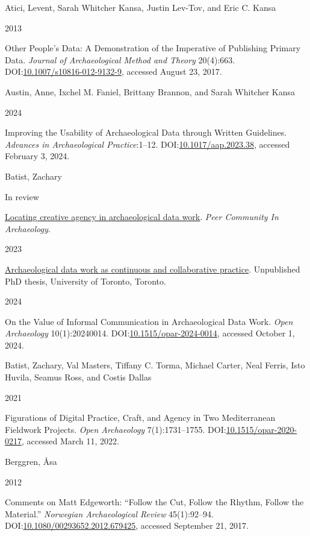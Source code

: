 \documentclass[
]{article}
\newlength{\cslhangindent}
\newlength{\csllabelwidth}
\newenvironment{CSLReferences}[2] %
 {\begin{list}{}{%
  \setlength{\itemindent}{0pt}
  \setlength{\leftmargin}{0pt}
  \setlength{\parsep}{0pt}
  \ifodd #1
   \setlength{\leftmargin}{\cslhangindent}
   \setlength{\itemindent}{-1\cslhangindent}
  \fi
  \setlength{\itemsep}{#2\baselineskip}}}
 {\end{list}}
\newcommand{\CSLBlock}[1]{\hfill\break\parbox[t]{\linewidth}{\strut\ignorespaces#1\strut}}
\newcommand{\CSLLeftMargin}[1]{\parbox[t]{\csllabelwidth}{\strut#1\strut}}
\newcommand{\CSLRightInline}[1]{\parbox[t]{\linewidth - \csllabelwidth}{\strut#1\strut}}
\begin{document}
\label{refs}
\begin{CSLReferences}{0}{1}
\CSLBlock{Atici, Levent, Sarah Whitcher Kansa, Justin Lev-Tov, and Eric
C. Kansa}
\CSLLeftMargin{ 2013}%
\CSLRightInline{Other {People}'s {Data}: {A Demonstration} of the
{Imperative} of {Publishing Primary Data}. \emph{Journal of
Archaeological Method and Theory} 20(4):663.
DOI:\href{https://doi.org/10.1007/s10816-012-9132-9}{10.1007/s10816-012-9132-9},
accessed August 23, 2017.}

\CSLBlock{Austin, Anne, Ixchel M. Faniel, Brittany Brannon, and Sarah
Whitcher Kansa}
\CSLLeftMargin{ 2024}%
\CSLRightInline{Improving the {Usability} of {Archaeological Data}
through {Written Guidelines}. \emph{Advances in Archaeological
Practice}:1--12.
DOI:\href{https://doi.org/10.1017/aap.2023.38}{10.1017/aap.2023.38},
accessed February 3, 2024.}

\CSLBlock{Batist, Zachary}
\CSLLeftMargin{ In review}%
\CSLRightInline{\href{https://zackbatist.info/locating-creative-agency/}{Locating
creative agency in archaeological data work}. \emph{Peer Community In
Archaeology}.}

\CSLLeftMargin{ 2023 }%
\CSLRightInline{\href{https://hdl.handle.net/1807/130306}{Archaeological
data work as continuous and collaborative practice}. Unpublished PhD
thesis, University of Toronto, Toronto.}

\CSLLeftMargin{ 2024 }%
\CSLRightInline{On the {Value} of {Informal Communication} in
{Archaeological Data Work}. \emph{Open Archaeology} 10(1):20240014.
DOI:\href{https://doi.org/10.1515/opar-2024-0014}{10.1515/opar-2024-0014},
accessed October 1, 2024.}

\CSLBlock{Batist, Zachary, Val Masters, Tiffany C. Torma, Michael
Carter, Neal Ferris, Isto Huvila, Seamus Ross, and Costis Dallas}
\CSLLeftMargin{ 2021}%
\CSLRightInline{Figurations of {Digital Practice}, {Craft}, and {Agency}
in {Two Mediterranean Fieldwork Projects}. \emph{Open Archaeology}
7(1):1731--1755.
DOI:\href{https://doi.org/10.1515/opar-2020-0217}{10.1515/opar-2020-0217},
accessed March 11, 2022.}

\CSLBlock{Berggren, Åsa}
\CSLLeftMargin{ 2012}%
\CSLRightInline{Comments on {Matt Edgeworth}: {``{Follow} the {Cut},
{Follow} the {Rhythm}, {Follow} the {Material}.''} \emph{Norwegian
Archaeological Review} 45(1):92--94.
DOI:\href{https://doi.org/10.1080/00293652.2012.679425}{10.1080/00293652.2012.679425},
accessed September 21, 2017.}


\end{CSLReferences}
\end{document}
